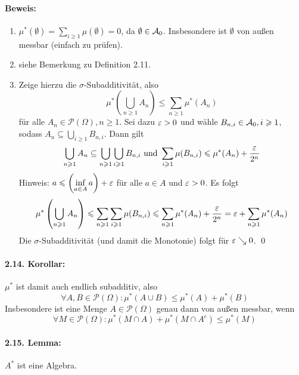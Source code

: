 \paragraph{Beweis:}
\begin{enumerate}[label=(\roman*)]
    \item $\mu^*(\emptyset)=\sum_{i\geq1}\mu(\emptyset)=0$, da $\emptyset\in\mathcal{A}_0$. Insbesondere ist $\emptyset$ von au\ss{}en messbar (einfach zu pr\"ufen).
    \item siehe Bemerkung zu Definition 2.11. 
    \item Zeige hierzu die $\sigma$-Subadditivit\"at, also 
    $$\mu^*\left(\bigcup_{n\geq1}A_n\right)\leq\sum_{n\geq1}\mu^*(A_n)$$
    f\"ur alle $A_n\in\mathcal{P}(\Omega),n\ge1$. Sei dazu $\varepsilon>0$ und w\"ahle $B_{n,i}\in\mathcal{A}_0,i\geqslant1$, sodass $A_n\subseteq\bigcup_{i\geq1}B_{n,i}$. Dann gilt 
    $$\bigcup_{n\geqslant1}A_n\subseteq\bigcup_{n\geqslant1}\bigcup_{i\geqslant1}B_{n,i}\text{ und }\sum_{i\geqslant1}\mu(B_{n,i})\leqslant\mu^*(A_n)+\dfrac{\varepsilon}{2^n}$$
Hinweis: $a\leqslant\left(\displaystyle\inf_{a\in A}a\right)+\varepsilon$ f\"ur alle $a\in A$ und $\varepsilon>0$. Es folgt
$$\mu^*\left(\bigcup_{n\geqslant1}A_n\right)\leqslant\sum_{n\geqslant1}\sum_{i\geqslant1}\mu(B_{n,i})\leqslant\sum_{n\geqslant1}\mu^*(A_n)+\dfrac{\varepsilon}{2^n}=\varepsilon+\sum_{n\geqslant1}\mu^*(A_n)$$
Die $\sigma$-Subadditivit\"at (und damit die Monotonie) folgt f\"ur $\varepsilon\searrow0$. \qed
\end{enumerate}

\paragraph{2.14. Korollar:}$\mu^*$ ist damit auch endlich subadditiv, also
$$\forall A,B\in\mathcal{P}(\Omega):\mu^*(A\cup B)\leq\mu^*(A)+\mu^*(B)$$
Insbesondere ist eine Menge $A\in\mathcal{P}(\Omega)$ genau dann von au\ss{}en messbar, wenn
$$\forall M\in\mathcal{P}(\Omega):\mu^*(M\cap A)+ \mu^*(M\cap A^c)\leq\mu^*(M)$$

\paragraph{2.15. Lemma:}$A^*$ ist eine Algebra. 

